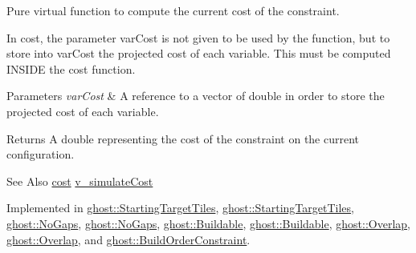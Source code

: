 Pure virtual function to compute the current cost of the constraint. 

In cost, the parameter var\-Cost is not given to be used by the function, but to store into var\-Cost the projected cost of each variable. This must be computed I\-N\-S\-I\-D\-E the cost function.


\begin{DoxyParams}{Parameters}
{\em var\-Cost} & A reference to a vector of double in order to store the projected cost of each variable. \\
\hline
\end{DoxyParams}
\begin{DoxyReturn}{Returns}
A double representing the cost of the constraint on the current configuration. 
\end{DoxyReturn}
\begin{DoxySeeAlso}{See Also}
\hyperlink{classghost_1_1Constraint_a5051092934738b004fe848190a5aa9a5}{cost} \hyperlink{classghost_1_1Constraint_a8dd05c04dbce51e88a6301e9332fb2f5}{v\-\_\-simulate\-Cost} 
\end{DoxySeeAlso}


Implemented in \hyperlink{classghost_1_1StartingTargetTiles_aa9474c7fb81691a2059d2e5614702544}{ghost\-::\-Starting\-Target\-Tiles}, \hyperlink{classghost_1_1StartingTargetTiles_aa9474c7fb81691a2059d2e5614702544}{ghost\-::\-Starting\-Target\-Tiles}, \hyperlink{classghost_1_1NoGaps_a3fa23de6946e443f009ecb5054a96572}{ghost\-::\-No\-Gaps}, \hyperlink{classghost_1_1NoGaps_a3fa23de6946e443f009ecb5054a96572}{ghost\-::\-No\-Gaps}, \hyperlink{classghost_1_1Buildable_a584162de15bdeb91c7f9a0d0a0fa3c87}{ghost\-::\-Buildable}, \hyperlink{classghost_1_1Buildable_a584162de15bdeb91c7f9a0d0a0fa3c87}{ghost\-::\-Buildable}, \hyperlink{classghost_1_1Overlap_a7a926991f06c785126e5d7995953e493}{ghost\-::\-Overlap}, \hyperlink{classghost_1_1Overlap_a7a926991f06c785126e5d7995953e493}{ghost\-::\-Overlap}, and \hyperlink{classghost_1_1BuildOrderConstraint_afdcfa9e285cc137841f5fb733f2655e9}{ghost\-::\-Build\-Order\-Constraint}.

